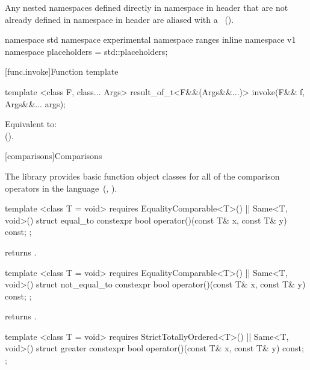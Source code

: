 \pnum
Any nested namespaces defined directly in namespace  in header 
that are not already defined in namespace  in header
 are aliased with a
~(). \enterexample
\begin{codeblock}
namespace std { namespace experimental { namespace ranges { inline namespace v1 {
  namespace placeholders = std::placeholders;
}}}}
\end{codeblock}
\exitexample

[func.invoke]{Function template }
\begin{itemdecl}
template <class F, class... Args>
result_of_t<F&&(Args&&...)> invoke(F&& f, Args&&... args);
\end{itemdecl}
\begin{itemdescr}
\pnum
\effects Equivalent to: \\  ().
\end{itemdescr}

[comparisons]{Comparisons}

\pnum
The library provides basic function object classes for all of the comparison
operators in the language~(, ).

%
\begin{itemdecl}
template <class T = void>
  requires EqualityComparable<T>() || Same<T, void>()
struct equal_to {
  constexpr bool operator()(const T& x, const T& y) const;
};
\end{itemdecl}

\begin{itemdescr}
\pnum
{} returns .
\end{itemdescr}

%
\begin{itemdecl}
template <class T = void>
  requires EqualityComparable<T>() || Same<T, void>()
struct not_equal_to {
  constexpr bool operator()(const T& x, const T& y) const;
};
\end{itemdecl}

\begin{itemdescr}
\pnum
{} returns .
\end{itemdescr}

%
\begin{itemdecl}
template <class T = void>
  requires StrictTotallyOrdered<T>() || Same<T, void>()
struct greater {
  constexpr bool operator()(const T& x, const T& y) const;
};
\end{itemdecl}


